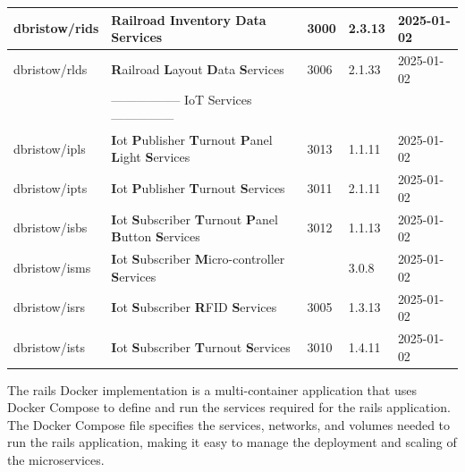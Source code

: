 \begin{longtable}{|L{3cm}|L{7cm}|L{1cm}|L{1.5cm}|L{2cm}|}
  dbristow/rids & \textbf{R}ailroad \textbf{I}nventory \textbf{D}ata \textbf{S}ervices  & 3000 & 2.3.13 & 2025-01-02 \\ \hline
  dbristow/rlds & \textbf{R}ailroad \textbf{L}ayout \textbf{D}ata \textbf{S}ervices  & 3006 & 2.1.33 & 2025-01-02 \\ \hline
  & ----------------- IoT Services --------------- &  &  & \\ \hline
  dbristow/ipls & \textbf{I}ot \textbf{P}ublisher \textbf{T}urnout \textbf{P}anel \textbf{L}ight \textbf{S}ervices & 3013 & 1.1.11 & 2025-01-02 \\ \hline
  dbristow/ipts & \textbf{I}ot \textbf{P}ublisher \textbf{T}urnout \textbf{S}ervices & 3011 & 2.1.11 & 2025-01-02 \\ \hline
  dbristow/isbs & \textbf{I}ot \textbf{S}ubscriber \textbf{T}urnout \textbf{P}anel \textbf{B}utton \textbf{S}ervices & 3012 & 1.1.13 & 2025-01-02 \\ \hline
  dbristow/isms & \textbf{I}ot \textbf{S}ubscriber \textbf{M}icro-controller \textbf{S}ervices &  & 3.0.8 & 2025-01-02 \\ \hline
  dbristow/isrs & \textbf{I}ot \textbf{S}ubscriber \textbf{R}FID \textbf{S}ervices & 3005 & 1.3.13 & 2025-01-02 \\ \hline
  dbristow/ists & \textbf{I}ot \textbf{S}ubscriber \textbf{T}urnout \textbf{S}ervices & 3010 & 1.4.11 & 2025-01-02 \\ \hline
    \end{longtable}
The \gls{rails} Docker implementation is a multi-container application that uses Docker Compose to define and run the services required for the \gls{rails} application. The Docker Compose file specifies the services, networks, and volumes needed to run the \gls{rails} application, making it easy to manage the deployment and scaling of the microservices.

